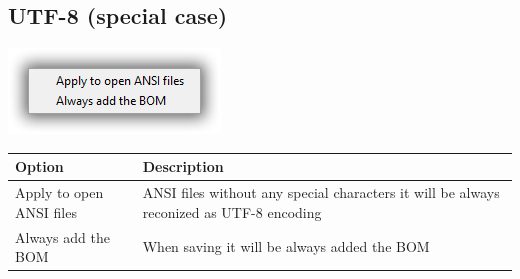 \hypertarget{menu_format_utf8}{}
\subsection{UTF-8 (special case)}

\includegraphics[scale=0.50]{./res/menu_format_utf8.png}\\

\begin{scriptsize}
  \begin{tabularx}{\textwidth}{>{\hsize=0.4\hsize}X>{\hsize=0.6\hsize}X}\\
    \hline
    \textbf{Option} & \textbf{Description} \\
    \hline
    Apply to open ANSI files & ANSI files without any special characters it will be always reconized as UTF-8 encoding \\
    Always add the BOM & When saving it will be always added the BOM \\
    \hline
  \end{tabularx}
\end{scriptsize}
